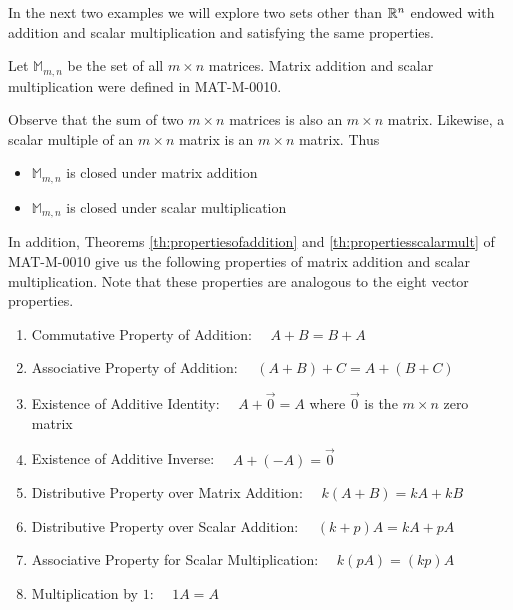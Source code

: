 \documentclass{ximera}
\begin{document}
In the next two examples we will explore two sets other than $\mathbb{R}^n$ endowed with addition and scalar multiplication and satisfying the same properties.

\begin{example}\label{ex:setofmatricesvectorspace}
Let $\mathbb{M}_{m,n}$ be the set of all $m\times n$ matrices.  Matrix addition and scalar multiplication were defined in MAT-M-0010.

Observe that the sum of two $m\times n$ matrices is also an $m\times n$ matrix. Likewise, a scalar multiple of an $m\times n$ matrix is an $m\times n$ matrix.  Thus 
\begin{itemize}
    \item[] $\mathbb{M}_{m,n}$ is closed under matrix addition
    \item[] $\mathbb{M}_{m,n}$ is closed under scalar multiplication
\end{itemize}

In addition, Theorems \ref{th:propertiesofaddition} and \ref{th:propertiesscalarmult} of MAT-M-0010 give us the following properties of matrix addition and scalar multiplication.  Note that these properties are analogous to the eight vector properties.
\begin{enumerate}
  \item 
  Commutative Property of Addition:  $\quad A+B=B+A$
  \item 
  Associative Property of Addition: $\quad (A+B)+C=A+(B+C)$
  \item 
  Existence of Additive Identity:  $\quad A+\vec{0}=A$ where $\vec{0}$ is the $m \times n$ zero matrix
  \item 
  Existence of Additive Inverse:  $\quad A+(-A)=\vec{0}$
  \item
  Distributive Property over Matrix Addition:  $\quad k(A+B)=kA+kB$
  \item
  Distributive Property over Scalar Addition:  $\quad (k+p)A=kA+pA$
  \item 
  Associative Property for Scalar Multiplication: $\quad k(pA)=(kp)A$
  \item 
  Multiplication by $1$: $\quad 1A=A$
  \end{enumerate}
\end{example}
\end{document}
